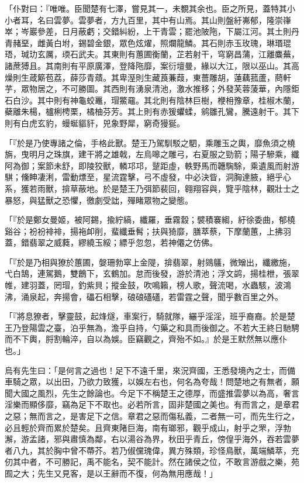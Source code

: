 \begin{pinyinscope}
「仆對曰：『唯唯。臣聞楚有七澤，嘗見其一，未覩其余也。臣之所見，蓋特其小小者耳，名曰雲夢。雲夢者，方九百里，其中有山焉。其山則盤紆岪郁，隆崇嵂崒；岑巖參差，日月蔽虧；交錯糾紛，上干青雲；罷池陂陁，下屬江河。其土則丹青赭堊，雌黃白坿，錫碧金銀，眾色炫燿，照爛龍鱗。其石則赤玉玫瑰，琳瑉琨珸，瑊玏玄厲，瑌石武夫。其東則有蕙圃衡蘭，芷若射干，穹窮昌蒲，江離麋蕪，諸蔗猼且。其南則有平原廣澤，登降陁靡，案衍壇曼，緣以大江，限以巫山。其高燥則生葴簛苞荔，薛莎青薠。其卑溼則生藏莨蒹葭，東薔雕胡，蓮藕菰蘆，蔄軒芋，眾物居之，不可勝圖。其西則有湧泉清池，激水推移；外發芙蓉蔆華，內隱鉅石白沙。其中則有神龜蛟鼉，瑁鱉黿。其北則有陰林巨樹，楩枏豫章，桂椒木蘭，蘗離朱楊，櫨梸梬栗，橘柚芬芳。其上則有赤猨蠷蝚，鹓雛孔鸞，騰遠射干。其下則有白虎玄豹，蟃蜒貙豻，兕象野犀，窮奇獌狿。

「『於是乃使專諸之倫，手格此獸。楚王乃駕馴駁之駟，乘雕玉之輿，靡魚須之橈旃，曳明月之珠旗，建干將之雄戟，左烏嗥之雕弓，右夏服之勁箭；陽子驂乘，纖阿為御；案節未舒，即陵狡獸，轔邛邛，蹵距虛，軼野馬而韢騊駼，乘遺風而射游騏；儵眒凄浰，雷動熛至，星流霆擊，弓不虛發，中必決眥，洞胸達腋，絕乎心系，獲若雨獸，揜草蔽地。於是楚王乃弭節裴回，翱翔容與，覽乎陰林，觀壯士之暴怒，與猛獸之恐懼，徼劇受詘，殫睹眾物之變態。

「『於是鄭女曼姬，被阿錫，揄紵縞，纖羅，垂霧縠；襞積褰縐，紆徐委曲，郁橈谿谷；衯衯裶裶，揚袘卹削，蜚纖垂髾；扶與猗靡，膳萃蔡，下摩蘭蕙，上拂羽蓋，錯翡翠之威蕤，繆繞玉綏；縹乎忽忽，若神僊之仿佛。

「『於是乃相與獠於蕙圃，媻珊勃窣上金隄，揜翡翠，射鵕鸃，微矰出，纖繳施，弋白鵠，連駕鵝，雙鶬下，玄鶴加。怠而後發，游於清池；浮文鹢，揚桂枻，張翠帷，建羽蓋，罔瑁，釣紫貝；摐金鼓，吹鳴籟，榜人歌，聲流喝，水蟲駭，波鴻沸，涌泉起，奔揚會，礧石相擊，硠硠礚礚，若雷霆之聲，聞乎數百里之外。

「『將息獠者，擊靈鼓，起烽燧，車案行，騎就隊，纚乎淫淫，班乎裔裔。於是楚王乃登陽雲之臺，泊乎無為，澹乎自持，勺藥之和具而後御之。不若大王終日馳騁而不下輿，脟割輪淬，自以為娛。臣竊觀之，齊殆不如。』於是王默然無以應仆也。」

烏有先生曰：「是何言之過也！足下不遠千里，來況齊國，王悉發境內之士，而備車騎之眾，以出田，乃欲力致獲，以娛左右也，何名為夸哉！問楚地之有無者，願聞大國之風烈，先生之餘論也。今足下不稱楚王之德厚，而盛推雲夢以為高，奢言淫樂而顯侈靡，竊為足下不取也。必若所言，固非楚國之美也。有而言之，是章君之惡；無而言之，是害足下之信。章君之惡而傷私義，二者無一可，而先生行之，必且輕於齊而累於楚矣。且齊東陼巨海，南有瑯邪，觀乎成山，射乎之罘，浮勃澥，游孟諸，邪與肅慎為鄰，右以湯谷為界，秋田乎青丘，傍偟乎海外，吞若雲夢者八九，其於胸中曾不蔕芥。若乃俶儻瑰偉，異方殊類，珍怪鳥獸，萬端鱗萃，充仞其中者，不可勝記，禹不能名，契不能計。然在諸侯之位，不敢言游戲之樂，苑囿之大；先生又見客，是以王辭而不復，何為無用應哉！」


\end{pinyinscope}
